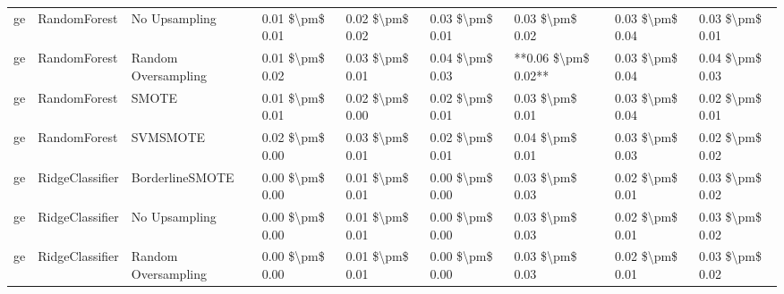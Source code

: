 \begin{tabular}{lllllllll}
      ge &                    RandomForest &                 No Upsampling & 0.01 \$\textbackslash pm\$ 0.01 &           0.02 \$\textbackslash pm\$ 0.02 &       0.03 \$\textbackslash pm\$ 0.01 &        0.03 \$\textbackslash pm\$ 0.02 &                         0.03 \$\textbackslash pm\$ 0.04 &     0.03 \$\textbackslash pm\$ 0.01 \\
      ge &                    RandomForest &           Random Oversampling & 0.01 \$\textbackslash pm\$ 0.02 &           0.03 \$\textbackslash pm\$ 0.01 &       0.04 \$\textbackslash pm\$ 0.03 &    **0.06 \$\textbackslash pm\$ 0.02** &                         0.03 \$\textbackslash pm\$ 0.04 &     0.04 \$\textbackslash pm\$ 0.03 \\
      ge &                    RandomForest &                         SMOTE & 0.01 \$\textbackslash pm\$ 0.01 &           0.02 \$\textbackslash pm\$ 0.00 &       0.02 \$\textbackslash pm\$ 0.01 &        0.03 \$\textbackslash pm\$ 0.01 &                         0.03 \$\textbackslash pm\$ 0.04 &     0.02 \$\textbackslash pm\$ 0.01 \\
      ge &                    RandomForest &                      SVMSMOTE & 0.02 \$\textbackslash pm\$ 0.00 &           0.03 \$\textbackslash pm\$ 0.01 &       0.02 \$\textbackslash pm\$ 0.01 &        0.04 \$\textbackslash pm\$ 0.01 &                         0.03 \$\textbackslash pm\$ 0.03 &     0.02 \$\textbackslash pm\$ 0.02 \\
      ge &                 RidgeClassifier &               BorderlineSMOTE & 0.00 \$\textbackslash pm\$ 0.00 &           0.01 \$\textbackslash pm\$ 0.01 &       0.00 \$\textbackslash pm\$ 0.00 &        0.03 \$\textbackslash pm\$ 0.03 &                         0.02 \$\textbackslash pm\$ 0.01 &     0.03 \$\textbackslash pm\$ 0.02 \\
      ge &                 RidgeClassifier &                 No Upsampling & 0.00 \$\textbackslash pm\$ 0.00 &           0.01 \$\textbackslash pm\$ 0.01 &       0.00 \$\textbackslash pm\$ 0.00 &        0.03 \$\textbackslash pm\$ 0.03 &                         0.02 \$\textbackslash pm\$ 0.01 &     0.03 \$\textbackslash pm\$ 0.02 \\
      ge &                 RidgeClassifier &           Random Oversampling & 0.00 \$\textbackslash pm\$ 0.00 &           0.01 \$\textbackslash pm\$ 0.01 &       0.00 \$\textbackslash pm\$ 0.00 &        0.03 \$\textbackslash pm\$ 0.03 &                         0.02 \$\textbackslash pm\$ 0.01 &     0.03 \$\textbackslash pm\$ 0.02 \\

\end{tabular}
